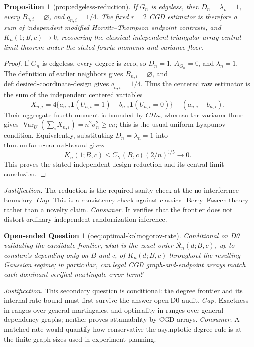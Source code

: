 \documentclass{article}
\newtheorem{proposition}{Proposition}
\newtheorem{openendedquestion}{Open-ended Question}
\begin{document}
\begin{proposition}[prop:edgeless-reduction]\label{prop:edgeless-reduction}
If \(G_n\) is edgeless, then \(D_n=\lambda_n=1\), every \(B_{n,i}=\varnothing\), and \(q_{n,i}=1/4\). The fixed \(r=2\) CGD estimator is therefore a sum of independent modified Horvitz--Thompson endpoint contrasts, and \(K_n(1;B,c)\to0\), recovering the classical independent triangular-array central limit theorem under the stated fourth moments and variance floor.
\end{proposition}
\begin{proof}
If \(G_n\) is edgeless, every degree is zero, so \(D_n=1\), \(A_{G_n}=0\), and \(\lambda_n=1\).  The definition of earlier neighbors gives \(B_{n,i}=\varnothing\), and \(\mathrm{def:desired\text{-}coordinate\text{-}design}\) gives \(q_{n,i}=1/4\).  Thus the centered raw estimator is the sum of the independent centered variables
\[
 X_{n,i}=4\{a_{n,i}\mathbf1(U_{n,i}=1)-b_{n,i}\mathbf1(U_{n,i}=0)\}-(a_{n,i}-b_{n,i}).
\]
Their aggregate fourth moment is bounded by \(CBn\), whereas the variance floor gives \(\operatorname{Var}_U(\sum_iX_{n,i})=n^2\sigma_n^2\ge cn\); this is the usual uniform Lyapunov condition.  Equivalently, substituting \(D_n=\lambda_n=1\) into \(\mathrm{thm:uniform\text{-}normal\text{-}bound}\) gives
\[
 K_n(1;B,c)\le C_{\mathrm N}(B,c)(2/n)^{1/5}\longrightarrow0.
\]
This proves the stated independent-design reduction and its central limit conclusion.
\end{proof}
\par\smallskip\noindent \textit{Justification.} The reduction is the required sanity check at the no-interference boundary. \textit{Gap.} This is a consistency check against classical Berry--Esseen theory rather than a novelty claim. \textit{Consumer.} It verifies that the frontier does not distort ordinary independent randomization inference.

\begin{openendedquestion}[oeq:optimal-kolmogorov-rate]\label{oeq:optimal-kolmogorov-rate}
Conditional on D0 validating the candidate frontier, what is the exact order \(\mathcal R_n(d;B,c)\), up to constants depending only on \(B\) and \(c\), of \(K_n(d;B,c)\) throughout the resulting Gaussian regime; in particular, can legal CGD graph-and-endpoint arrays match each dominant verified martingale error term?
\end{openendedquestion}
\par\smallskip\noindent \textit{Justification.} This secondary question is conditional: the degree frontier and its internal rate bound must first survive the answer-open D0 audit. \textit{Gap.} Exactness in \cite{Haeusler1988MartingaleRate} ranges over general martingales, and optimality in \cite{JanischLehericy2024SparseDependencyGraph} ranges over general dependency graphs; neither proves attainability by CGD arrays. \textit{Consumer.} A matched rate would quantify how conservative the asymptotic degree rule is at the finite graph sizes used in experiment planning.
\end{document}
